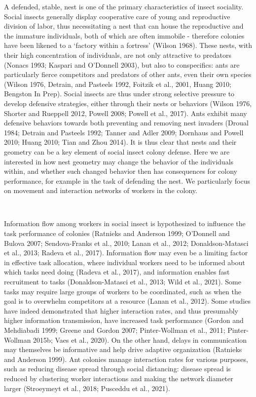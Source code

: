 \documentclass[3p]{elsarticle} %
\begin{document}
A defended, stable, nest is one of the primary characteristics of insect
sociality. Social insects generally display cooperative care of young
and reproductive division of labor, thus necessitating a nest that can
house the reproductive and the immature individuals, both of which are
often immobile - therefore colonies have been likened to a `factory
within a fortress' (Wilson 1968). These nests, with their high
concentration of individuals, are not only attractive to predators
(Nonacs 1993; Kaspari and O'Donnell 2003), but also to conspecifics:
ants are particularly fierce competitors and predators of other ants,
even their own species (Wilson 1976, Detrain, and Pasteels 1992, Foitzik
et al., 2001, Huang 2010; Bengston In Prep). Social insects are thus
under strong selective pressure to develop defensive strategies, either
through their nests or behaviors (Wilson 1976, Shorter and Rueppell
2012, Powell 2008; Powell et al., 2017). Ants exhibit many defensive
behaviors towards both preventing and removing nest invaders (Droual
1984; Detrain and Pasteels 1992; Tanner and Adler 2009; Dornhaus and
Powell 2010; Huang 2010; Tian and Zhou 2014). It is thus clear that
nests and their geometry can be a key element of social insect colony
defense. Here we are interested in how nest geometry may change the
behavior of the individuals within, and whether such changed behavior
then has consequences for colony performance, for example in the task of
defending the nest. We particularly focus on movement and interaction
networks of workers in the colony.

~

Information flow among workers in social insect is hypothesized to
influence the task performance of colonies (Ratnieks and Anderson 1999;
O'Donnell and Bulova 2007; Sendova-Franks et al., 2010; Lanan et al.,
2012; Donaldson-Matasci et al., 2013; Radeva et al., 2017). Information
flow may even be a limiting factor in effective task allocation, where
individual workers need to be informed about which tasks need doing
(Radeva et al., 2017), and information enables fast recruitment to tasks
(Donaldson-Matasci et al., 2013; Wild et al., 2021). Some tasks may
require large groups of workers to be coordinated, such as when the goal
is to overwhelm competitors at a resource (Lanan et al., 2012). Some
studies have indeed demonstrated that higher interaction rates, and thus
presumably higher information transmission, have increased task
performance (Gordon and Mehdiabadi 1999; Greene and Gordon 2007;
Pinter-Wollman et al., 2011; Pinter-Wollman 2015b; Vaes et al., 2020).
On the other hand, delays in communication may themselves be informative
and help drive adaptive organization (Ratnieks and Anderson 1999). Ant
colonies manage interaction rates for various purposes, such as reducing
disease spread through social distancing: disease spread is reduced by
clustering worker interactions and making the network diameter larger
(Stroeymeyt et al., 2018; Pusceddu et al., 2021).
\end{document}
